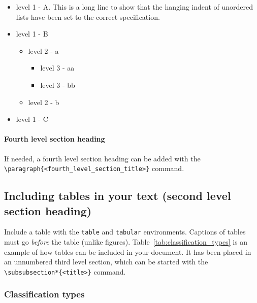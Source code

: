 \documentclass{nato-sto}
\begin{document}
\begin{itemize}
\item level 1 - A. This is a long line to show that the hanging indent of unordered lists have been set to the correct specification.
\item level 1 - B
	\begin{itemize}
		\item level 2 - a
		\begin{itemize}
			\item level 3 - aa
			\item level 3 - bb
		\end{itemize}
		\item level 2 - b
	\end{itemize}
\item level 1 - C
\end{itemize}

\paragraph{Fourth level section heading}

If needed, a fourth level section heading can be added with the \verb|\paragraph{<fourth_level_section_title>}| command.

\newpage

\subsection{Including tables in your text (second level section heading)}

Include a table with the \verb|table| and \verb|tabular| environments. Captions of tables must go \emph{before} the table (unlike figures). Table~\ref{tab:classification_types} is an example of how tables can be included in your document. It has been placed in an unnumbered third level section, which can be started with the \verb|\subsubsection*{<title>}| command.

\subsubsection*{Classification types}
\end{document}
